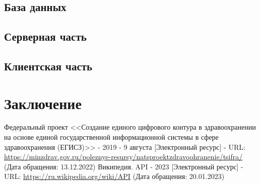 \documentclass[a4paper,article]{article}
\begin{document}
    \subsection{База данных}\label{Реализация. База данных}

    \subsection{Серверная часть}\label{Реализация. Серверная часть}

    \subsection{Клиентская часть}\label{Реализация. Клиентская часть}

    \newpage

    \section*{Заключение}

    \newpage


    \begin{thebibliography}{}
         Федеральный проект <<Создание единого цифрового контура в здравоохранении на основе единой государственной информационной системы в сфере здравоохранения (ЕГИСЗ)>> - 2019 - 9 августа [Электронный ресурс] - URL: \url{https://minzdrav.gov.ru/poleznye-resursy/natsproektzdravoohranenie/tsifra/} (Дата обращения: 13.12.2022)
         Википедия. API - 2023 [Электронный ресурс] - URL: \url{https://ru.wikipedia.org/wiki/API} (Дата обращения: 20.01.2023)
    \end{thebibliography}
\end{document}
